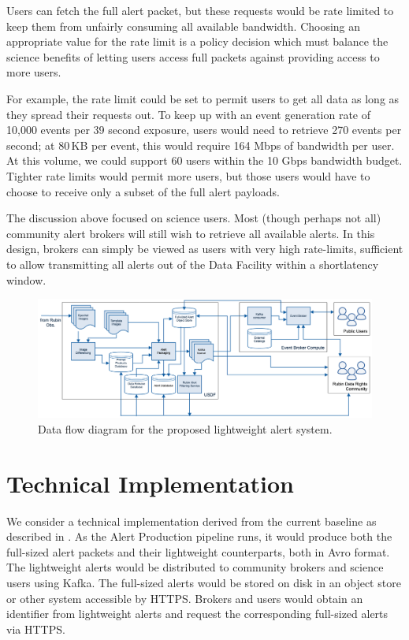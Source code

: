 \documentclass[DM,authoryear,toc]{lsstdoc}
\begin{document}
Users can fetch the full alert packet, but these requests would be rate limited to keep them from unfairly consuming all available bandwidth.
Choosing an appropriate value for the rate limit is a policy decision which must balance the science benefits of letting users access full packets against providing access to more users.

For example, the rate limit could be set to permit users to get all data as long as they spread their requests out.
To keep up with an event generation rate of 10,000 events per 39 second exposure, users would need to retrieve 270 events per second; at 80\,KB per event, this would require 164 Mbps of bandwidth per user.
At this volume, we could support 60 users within the 10 Gbps bandwidth budget.
Tighter rate limits would permit more users, but those users would have to choose to receive only a subset of the full alert payloads.

The discussion above focused on science users.
Most (though perhaps not all) community alert brokers will still wish to retrieve all available alerts.
In this design, brokers can simply be viewed as users with very high rate-limits, sufficient to allow transmitting all alerts out of the Data Facility within a shortlatency window.


\begin{figure}
  \begin{centering}
  \includegraphics[width=\textwidth]{fig/lightweight_alert_dist.png}
  \caption{Data flow diagram for the proposed lightweight alert system.
  \label{fig:lightweight}}
  \end{centering}
\end{figure}

\section{Technical Implementation}

We consider a technical implementation derived from the current baseline as described in
.
As the Alert Production pipeline runs, it would produce both the full-sized alert packets and their lightweight counterparts, both in Avro format.
The lightweight alerts would be distributed to community brokers and science users using Kafka.
The full-sized alerts would be stored on disk in an object store or other system accessible by HTTPS.
Brokers and users would obtain an identifier from lightweight alerts and request the corresponding full-sized alerts via HTTPS.
\end{document}
